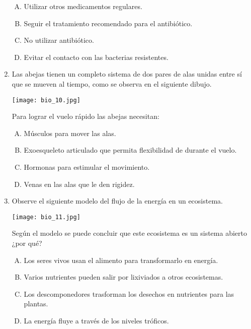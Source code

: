 \begin{enumerate}
\begin{enumerate}[(A)]
\item Utilizar  otros  medicamentos  regulares.
\item Seguir  el tratamiento  recomendado para  el antibiótico.
\item No utilizar  antibiótico.
\item Evitar  el contacto  con las bacterias resistentes.
\end{enumerate}



\item Las  abejas  tienen un  completo   sistema   de   dos  pares  de  alas   unidas    entre  sí    que  se mueven  al tiempo,   como se  observa  en el siguiente  dibujo. \label{bio-17}

\begin{flushleft}
\texttt{[image: bio\_10.jpg]} 
\end{flushleft}
Para  lograr  el vuelo rápido las  abejas  necesitan:

\begin{enumerate}[(A)]
\item Músculos  para mover  las  alas.
\item Exoesqueleto  articulado  que permita flexibilidad de durante  el  vuelo.
\item Hormonas para estimular el movimiento.
\item  Venas en las alas que  le den rigidez.
\end{enumerate}


\item  Observe el siguiente  modelo  del flujo   de la energía  en un ecosistema. \label{bio-18}

\begin{flushleft}
\texttt{[image: bio\_11.jpg]} 
\end{flushleft}

Según  el modelo se puede  concluir   que  este ecosistema es  un sistema  abierto ¿por qué?

\begin{enumerate}[(A)]
\item Los seres vivos usan el alimento para transformarlo en energía.
\item Varios  nutrientes  pueden salir por  lixiviados  a otros ecosistemas.
\item Los descomponedores  trasforman  los desechos   en nutrientes  para las plantas.
\item La energía fluye  a través  de los niveles    tróficos.
\end{enumerate}



\end{enumerate}
